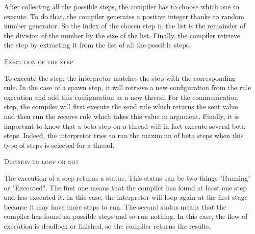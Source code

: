 \documentclass[11pt]{report}
\begin{document}
\tabto{1cm}After collecting all the possible steps, the compiler has to choose which one to execute. To do that, the compiler generates a positive integer thanks to random number generator. So the index of the chosen step in the list is the remainder of the division of the number by the size of the list. Finally, the compiler retrieve the step by extracting it from the list of all the possible steps.

\vspace*{10pt}
\vspace*{10pt}
{}
\tabto{1cm} {\Large \textsc{Execution of the step}}
\vspace*{10pt}

\tabto{1cm}To execute the step, the interpretor matches the step with the corresponding rule. In the case of a spawn step, it will retrieve a new configuration from the rule execution and add this configuration as a new thread. For the communication step, the compiler will first execute the send rule which returns the sent value and then run the receive rule which takes this value in argument. Finally, it is important to know that a beta step on a thread will in fact execute several beta steps. Indeed, the interpretor tries to run the maximum of beta steps when this type of steps is selected for a thread.  

\vspace*{10pt}
\vspace*{10pt}
{}
\tabto{1cm} {\Large \textsc{Decision to loop or not}}
\vspace*{10pt}

\tabto{1cm}The execution of a step returns a status. This status can be two things "Running" or "Executed". The first one means that the compiler has found at least one step and has executed it. In this case, the interpretor will loop again at the first stage because it may have more steps to run. The second status means that the compiler has found no possible steps and so run nothing. In this case, the flow of execution is deadlock or finished, so the compiler returns the results. 

\vspace*{10pt}
\vspace*{10pt}
{}
\vspace*{3pt}
\vspace*{10pt}
\end{document}
